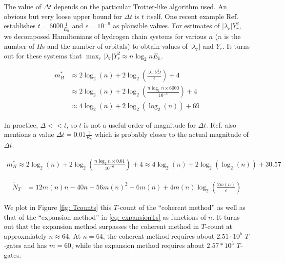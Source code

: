 The value of $\Delta t$ depends on the particular Trotter-like algorithm used. An obvious but very loose upper bound for $\Delta t$ is $t$ itself. One recent example Ref. \cite{Gate_Count} establishes $t = 6000 \frac{1}{E_h}$ and $\epsilon = 10^{-6}$ as plausible values. For estimates of $|\lambda_r|Y_r^2$, we decomposed Hamiltonians of hydrogen chain systems for various $n$ ($n$ is the number of $H$s and the number of orbitals) to obtain values of $|\lambda_r|$ and $Y_r$. It turns out for these systems that $\max_r |\lambda_r|Y_r^2 \approx n\log_2{n} E_h$.

\begin{equation}
    \begin{split}
        m^*_{H} &\approx 2\log_2(n) + 2\log_2\left(\frac{|\lambda_r|Y_r^2 t}{\epsilon}\right) + 4 \\
        &\approx 2\log_2(n) + 2\log_2\left(\frac{n\log_2{n}\times 6000}{10^{-6}}\right) + 4 \\
        &\approx 4\log_2(n) + 2\log_2(\log_2(n)) + 69
    \end{split}
\end{equation}

In practice, $\Delta << t$, so $t$ is not a useful order of magnitude for $\Delta t$. Ref. \cite{Gate_Count} also mentions a value $\Delta t = 0.01 \frac{1}{E_h}$ which is probably closer to the actual magnitude of $\Delta t$.

\begin{equation}
    \begin{split}
        m^*_{H} \approx 2\log_2(n) + 2\log_2\left(\frac{n\log_2{n}\times 0.01}{10^{-6}}\right) + 4 \approx 4\log_2(n) + 2\log_2(\log_2(n)) + 30.57
    \end{split}
\end{equation}

\begin{equation}
    \begin{split}
        \tilde{N}_{T} &= 12m(n)n - 40n + 56m(n)^2 - 6m(n) + 4m(n)\log_2(\frac{2m(n)}{\epsilon})
    \end{split}
\end{equation}

We plot in Figure \ref{fig: Tcounts} this $T$-count of the ``coherent method'' as well as that of the ``expansion method'' in \eqref{eq: expansionTs} as functions of $n$. It turns out that the expansion method surpasses the coherent method in $T$-count at approxmiately $n \approx 64$. At $n = 64$, the coherent method requires about $2.51 \cdot 10^5$ $T$-gates and has $m = 60$, while the expansion method requires about $2.57 * 10^5$ $T$-gates.

